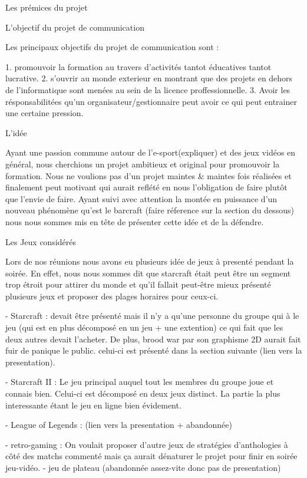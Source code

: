 Les prémices du projet

  L'objectif du projet de communication

    Les principaux objectifs du projet de communication sont :

    1. promouvoir la formation au travers d'activités tantot éducatives
    tantot lucrative.
    2. s'ouvrir au monde exterieur en montrant que des projets en dehors
    de l'informatique sont menées au sein de la licence
    proffessionnelle.
    3. Avoir les résponsabilitées qu'un organisateur/gestionnaire peut
    avoir ce qui peut entrainer une certaine pression.

  L'idée

    Ayant une passion commune autour de l'e-sport(expliquer) et des jeux
    vidéos en général, nous cherchions un projet ambitieux et original
    pour promouvoir la formation. Nous ne voulions pas d'un projet maintes
    & maintes fois réalisées et finalement peut motivant qui aurait
    reflété en nous l'obligation de faire plutôt que l'envie de faire.
    Ayant suivi avec attention la montée en puissance d'un nouveau
    phénomène qu'est le barcraft (faire réference sur la section du
    dessous) nous nous sommes mis en tête de présenter cette idée et de la
    défendre.

  Les Jeux considérés

    Lors de nos réunions nous avons eu plusieurs idée de jeux à presenté
    pendant la soirée. En effet, nous nous sommes dit que starcraft
    était peut être un segment trop étroit pour attirer du monde et
    qu'il fallait peut-être mieux présenté plusieurs jeux et proposer
    des plages horaires pour ceux-ci.

    - Starcraft : devait être présenté mais il n'y a qu'une personne du
    groupe qui à le jeu (qui est en plus décomposé en un jeu + une
    extention) ce qui fait que les deux autres devait l'acheter. De
    plus, brood war par son graphisme 2D aurait fait fuir de panique le
    public. celui-ci est présenté dans la section suivante (lien vers la
    presentation).

    - Starcraft II : Le jeu principal auquel tout les membres du groupe
    joue et connais bien. Celui-ci est décomposé en deux jeux distinct.
    La partie la plus interessante étant le jeu en ligne bien évidement.

    - League of Legends : (lien vers la presentation + abandonnée)

    - retro-gaming : On voulait proposer d'autre jeux de stratégies
    d'anthologies à côté des matchs commenté mais ça aurait dénaturer le
    projet pour finir en soirée jeu-vidéo.
    - jeu de plateau (abandonnée assez-vite donc pas de presentation)

